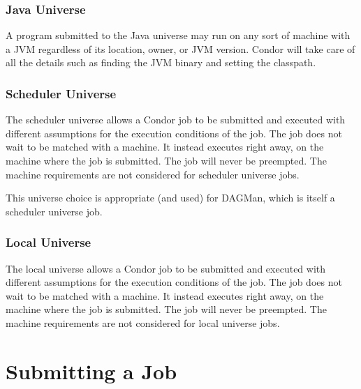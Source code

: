 \subsubsection{Java Universe}


A program submitted to the Java universe may run on any sort of machine
with a JVM regardless of its location, owner, or JVM version.  Condor
will take care of all the details such as finding the JVM binary and
setting the classpath.

\subsubsection{Scheduler Universe}

The scheduler universe allows a Condor job to be submitted and
executed with different assumptions for the execution conditions
of the job.
The job does not wait to be matched with a machine.
It instead executes right away, on the machine where the job
is submitted.
The job will never be preempted.
The machine requirements are not considered for scheduler universe
jobs.

This universe choice is appropriate (and used) for DAGMan,
which is itself a scheduler universe job.

\subsubsection{\label{sec:local-universe}Local Universe}

The local universe allows a Condor job to be submitted and
executed with different assumptions for the execution conditions
of the job.
The job does not wait to be matched with a machine.
It instead executes right away, on the machine where the job
is submitted.
The job will never be preempted.
The machine requirements are not considered for local universe
jobs.


\section{Submitting a Job}


